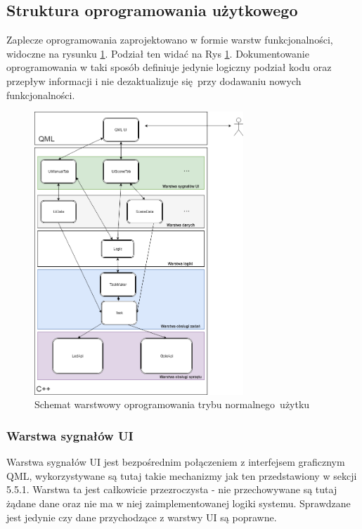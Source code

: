 \documentclass[12pt, eng, twoside, openany, final]{mgr}
\begin{document}
                \subsection{Struktura oprogramowania użytkowego}
                Zaplecze oprogramowania zaprojektowano w formie warstw funkcjonalności, widoczne na rysunku \ref{fig:layers}. Podział ten widać na Rys \ref{fig:layers}. Dokumentowanie oprogramowania w taki sposób definiuje jedynie logiczny podział kodu oraz przepływ informacji i nie dezaktualizuje się przy dodawaniu nowych funkcjonalności\cite{CleanCode}.  
                    \begin{figure}[H]
                    \begin{center}
                        \includegraphics[width=0.7\textwidth]{inz_diag1.png}
                        \caption{Schemat warstwowy oprogramowania trybu normalnego~użytku} \label{fig:layers}
                    \end{center}
                    \end{figure}
                \subsubsection{Warstwa sygnałów UI}
                Warstwa sygnałów UI jest bezpośrednim połączeniem z interfejsem graficznym QML, wykorzystywane są tutaj takie mechanizmy jak ten przedstawiony w sekcji 5.5.1. Warstwa ta jest całkowicie przezroczysta - nie przechowywane są tutaj żądane dane oraz nie ma w niej zaimplementowanej logiki systemu. Sprawdzane jest jedynie czy dane przychodzące z warstwy UI są poprawne.
                
\end{document}
